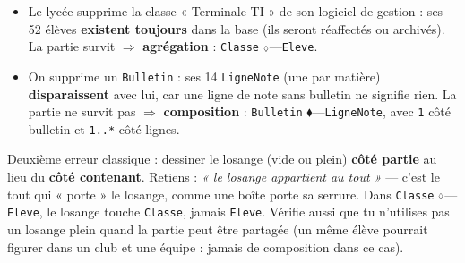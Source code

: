 \documentclass[11pt]{article}
\def\diamond{\mathbin{\scalebox{0.6}{$\Diamond$}}}%
\begin{document}
\begin{exemplebox}
\begin{itemize}
  \item Le lycée supprime la classe « Terminale TI » de son logiciel de gestion : ses 52 élèves \textbf{existent toujours} dans la base (ils seront réaffectés ou archivés). La partie survit $\Rightarrow$ \textbf{agrégation} : \texttt{Classe} $\diamond$---\texttt{Eleve}.
  \item On supprime un \texttt{Bulletin} : ses 14 \texttt{LigneNote} (une par matière) \textbf{disparaissent} avec lui, car une ligne de note sans bulletin ne signifie rien. La partie ne survit pas $\Rightarrow$ \textbf{composition} : \texttt{Bulletin} $\blacklozenge$---\texttt{LigneNote}, avec \texttt{1} côté bulletin et \texttt{1..*} côté lignes.
\end{itemize}
\end{exemplebox}

\begin{attention}
Deuxième erreur classique : dessiner le losange (vide ou plein) \textbf{côté partie} au lieu du \textbf{côté contenant}. Retiens : \emph{« le losange appartient au tout »} — c'est le tout qui « porte » le losange, comme une boîte porte sa serrure. Dans \texttt{Classe} $\diamond$---\texttt{Eleve}, le losange touche \texttt{Classe}, jamais \texttt{Eleve}. Vérifie aussi que tu n'utilises pas un losange plein quand la partie peut être partagée (un même élève pourrait figurer dans un club et une équipe : jamais de composition dans ce cas).
\end{attention}
\end{document}
